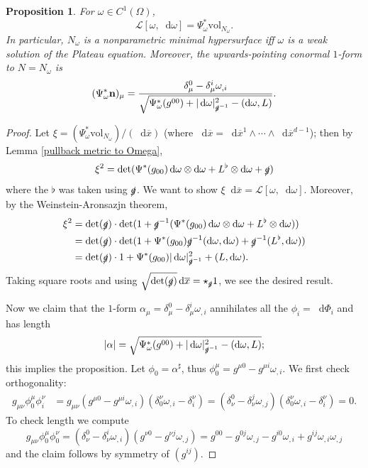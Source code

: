 \documentclass[reqno,12pt,letterpaper]{amsart}
\newcommand*\dif{\mathop{}\!\mathrm{d}}
\newcommand{\Lagrange}{\mathscr L}
\newcommand{\normal}{\mathbf n}
\newcommand{\vol}{\mathrm{vol}}
\newtheorem{proposition}[theorem]{Proposition}
\theoremstyle{definition}
\numberwithin{equation}{section}
\begin{document}
\begin{proposition}\label{construction of Plateau energy}
For $\omega \in C^1(\Omega)$,
$$\Lagrange[\omega, \dif \omega] = \Psi_\omega^* \vol_{N_\omega}.$$
In particular, $N_\omega$ is a nonparametric minimal hypersurface iff $\omega$ is a weak solution of the Plateau equation.
Moreover, the upwards-pointing conormal $1$-form to $N = N_\omega$ is
\begin{equation}\label{Josh helped}
(\Psi_\omega^* \normal)_\mu = \frac{\delta_\mu^0 - \delta_\mu^i \omega_{,i}}{\sqrt{\Psi_\omega^* (g^{00}) + |\dif \omega|_{\slashed g^{-1}}^2 - (\dif \omega, L)}}.
\end{equation}
\end{proposition}
\begin{proof}
Let $\xi = (\Psi_\omega^* \vol_{N_\omega})/(\dif \overline x)$ (where $\dif \overline x = \dif \overline x^1 \wedge \cdots \wedge \dif \overline x^{d - 1}$); then by Lemma \ref{pullback metric to Omega},
$$\xi^2 = \det(\Psi^* (g_{00}) \dif \omega \otimes \dif \omega + L^\flat \otimes \dif \omega + \slashed g)$$
where the $\flat$ was taken using $\slashed g$.
We want to show $\xi \dif \overline x = \Lagrange[\omega, \dif \omega]$.
Moreover, by the Weinstein-Aronsazjn theorem,
\begin{align*}
\xi^2 &= \det(\slashed g) \cdot \det(1 + \slashed g^{-1}(\Psi^* (g_{00}) \dif \omega \otimes \dif \omega + L^\flat \otimes \dif \omega))\\
&= \det (\slashed g) \cdot \det(1 + \Psi^*(g_{00}) \slashed g^{-1}(\dif \omega, \dif \omega) + \slashed g^{-1}(L^\flat, \dif \omega))\\
&= \det (\slashed g) \cdot 1 + \Psi^*(g_{00}) |\dif \omega|_{\slashed g^{-1}}^2 + (L, \dif \omega).
\end{align*}
Taking square roots and using $\sqrt{\det(\slashed g)} \dif \overline x = \star_{\slashed g} 1$, we see the desired result.

Now we claim that the $1$-form $\alpha_\mu = \delta_\mu^0 - \delta_\mu^i \omega_{,i}$
annihilates all the $\phi_i = \dif \Phi_i$ and has length
$$|\alpha| = \sqrt{\Psi_\omega^* (g^{00}) + |\dif \omega|_{\slashed g^{-1}}^2 - (\dif \omega, L)};$$
this implies the proposition.
Let $\phi_0 = \alpha^\sharp$, thus $\phi_0^\mu = g^{\mu 0} - g^{\mu i} \omega_{,i}$. We first check orthogonality:
\begin{align*}
g_{\mu\nu} \phi_0^\mu \phi_i^\nu &= g_{\mu\nu} (g^{\mu 0} - g^{\mu i} \omega_{,i}) (\delta_0^\nu \omega_{,i} - \delta^\nu_i) = (\delta_\nu^0 - \delta^j_\nu \omega_{,j}) (\delta^\nu_0 \omega_{,i} - \delta^\nu_i) = 0.
\end{align*}
To check length we compute
$$g_{\mu\nu} \phi_0^\mu \phi_0^\nu = (\delta_\nu^0 - \delta_\nu^i \omega_{,i}) (g^{\nu 0} - g^{\nu j} \omega_{,j}) = g^{00} - g^{0j} \omega_{,j} - g^{i0} \omega_{,i} + g^{ij} \omega_{,i} \omega_{,j}$$
and the claim follows by symmetry of $(g^{ij})$.
\end{proof}
\end{document}
